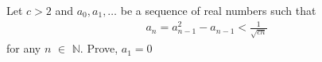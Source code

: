 Let $c>2$ and $a_0,a_1, \ldots$ be a sequence of real numbers such that
\begin{align*} a_n = a_{n-1}^2 - a_{n-1} < \frac{1}{\sqrt{cn}} \end{align*}for any $n$ $\in$ $\mathbb{N}$. Prove, $a_1=0$